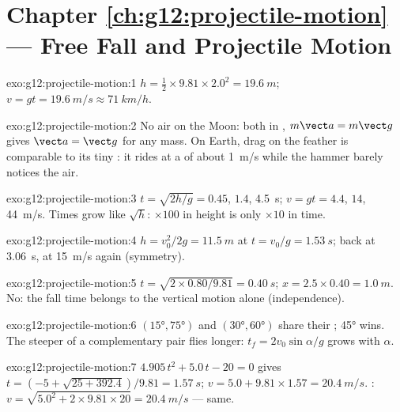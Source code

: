 \section*{Chapter \ref{ch:g12:projectile-motion} --- Free Fall and Projectile Motion}

\begin{solution}{exo:g12:projectile-motion:1}
$h = \tfrac12 \times 9.81 \times 2.0^2 = \qty{19.6}{m}$;
$v = gt = \qty{19.6}{m/s} \approx \qty{71}{km/h}$.
\end{solution}

\begin{solution}{exo:g12:projectile-motion:2}
No air on the Moon: both in , $m\vect a = m\vect g$ gives
$\vect a = \vect g$ for any mass. On Earth, drag on the feather is
comparable to its tiny : it rides at a  of about
\qty{1}{m/s} while the hammer barely notices the air.
\end{solution}

\begin{solution}{exo:g12:projectile-motion:3}
$t = \sqrt{2h/g} = 0.45$, $1.4$, \qty{4.5}{s};
$v = gt = 4.4$, $14$, \qty{44}{m/s}. Times grow like $\sqrt h$:
$\times 100$ in height is only $\times 10$ in time.
\end{solution}

\begin{solution}{exo:g12:projectile-motion:4}
$h = v_0^2/2g = \qty{11.5}{m}$ at $t = v_0/g = \qty{1.53}{s}$;
back at \qty{3.06}{s}, at \qty{15}{m/s} again (symmetry).
\end{solution}

\begin{solution}{exo:g12:projectile-motion:5}
$t = \sqrt{2 \times 0.80/9.81} = \qty{0.40}{s}$;
$x = 2.5 \times 0.40 = \qty{1.0}{m}$. No: the fall time belongs to
the vertical motion alone (independence).
\end{solution}

\begin{solution}{exo:g12:projectile-motion:6}
$(\ang{15},\ang{75})$ and $(\ang{30},\ang{60})$ share their ;
\ang{45} wins. The steeper of a complementary pair flies longer:
$t_f = 2v_0\sin\alpha/g$ grows with $\alpha$.
\end{solution}

\begin{solution}{exo:g12:projectile-motion:7}
$4.905\,t^2 + 5.0\,t - 20 = 0$ gives
$t = (-5 + \sqrt{25 + 392.4})/9.81 = \qty{1.57}{s}$;
$v = 5.0 + 9.81 \times 1.57 = \qty{20.4}{m/s}$. :
$v = \sqrt{5.0^2 + 2 \times 9.81 \times 20} = \qty{20.4}{m/s}$ ---
same.
\end{solution}

